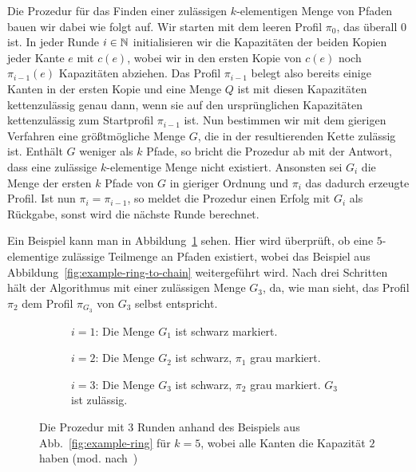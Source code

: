 Die Prozedur für das Finden einer zulässigen $k$-elementigen Menge von Pfaden bauen wir dabei wie folgt auf.
Wir starten mit dem leeren Profil $\pi_0$, das überall 0 ist.
In jeder Runde $i \in \mathbb N$ initialisieren wir die Kapazitäten der beiden Kopien jeder Kante $e$ mit $c(e)$, wobei wir
in den ersten Kopie von $c(e)$ noch $\pi_{i-1}(e)$ Kapazitäten abziehen.
Das Profil $\pi_{i-1}$ belegt also bereits einige Kanten in der ersten Kopie und eine Menge $Q$ ist mit diesen Kapazitäten
kettenzulässig genau dann, wenn sie auf den ursprünglichen Kapazitäten kettenzulässig zum Startprofil $\pi_{i-1}$ ist.
Nun bestimmen wir mit dem gierigen Verfahren eine größtmögliche Menge $G$, die in der resultierenden Kette
zulässig ist.
Enthält $G$ weniger als $k$ Pfade, so bricht die Prozedur ab mit der Antwort, dass eine zulässige $k$-elementige Menge
nicht existiert.
Ansonsten sei $G_i$ die Menge der ersten $k$ Pfade von $G$ in gieriger Ordnung und $\pi_{i}$ das dadurch erzeugte
Profil.
Ist nun $\pi_i = \pi_{i-1}$, so meldet die Prozedur einen Erfolg mit $G_i$ als Rückgabe, sonst wird die nächste Runde
berechnet.

Ein Beispiel kann man in Abbildung~\ref{fig:example-ring-procedure} sehen.
Hier wird überprüft, ob eine $5$-elementige zulässige Teilmenge an Pfaden existiert, wobei
das Beispiel aus Abbildung~\ref{fig:example-ring-to-chain} weitergeführt wird.
Nach drei Schritten hält der Algorithmus mit einer zulässigen Menge $G_3$, da, wie man sieht, das Profil $\pi_2$
dem Profil $\pi_{G_3}$ von $G_3$ selbst entspricht.

\begin{figure}[h]
	\begin{subfigure}{\textwidth}
		\centering
		\def\svgwidth{230bp}
		
		\caption{$i=1$: Die Menge $G_1$ ist schwarz markiert.}
	\end{subfigure}
	\begin{subfigure}{\textwidth}
		\centering
		\def\svgwidth{230bp}
		
		\caption{$i=2$: Die Menge $G_2$ ist schwarz, $\pi_1$ grau markiert.}
	\end{subfigure}
	\begin{subfigure}{\textwidth}
		\centering
		\def\svgwidth{230bp}
		
		\caption{$i=3$: Die Menge $G_3$ ist schwarz, $\pi_2$ grau markiert. $G_3$ ist zulässig.}
	\end{subfigure}
	\caption{Die Prozedur mit 3 Runden anhand des Beispiels aus Abb.~\ref{fig:example-ring} für $k=5$, wobei alle Kanten die Kapazität $2$ haben (mod. nach~\cite{paper})}
	\label{fig:example-ring-procedure}
\end{figure}

